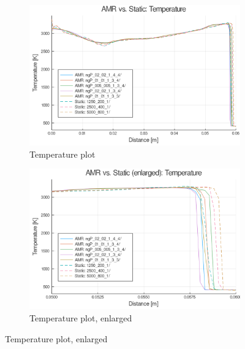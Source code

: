\begin{figure} \ContinuedFloat

    \centering
    \begin{subfigure}[]{\textwidth}
        \centering
        \includegraphics[width=\textwidth]{./figs/amrfigs/amrcompare/t.png}
        \caption{Temperature plot}
    \end{subfigure}

    \centering
    \begin{subfigure}[]{\textwidth}
        \centering
        \includegraphics[width=\textwidth]{./figs/amrfigs/amrcompare/te.png}
        \caption{Temperature plot, enlarged}
    \end{subfigure}

\end{figure}
